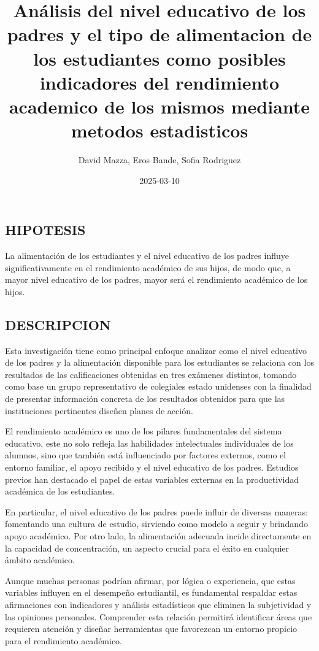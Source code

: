 \documentclass[
]{article}
\title{Análisis del nivel educativo de los padres y el tipo de
alimentacion de los estudiantes como posibles indicadores del
rendimiento academico de los mismos mediante metodos estadisticos}
\author{David Mazza, Eros Bande, Sofia Rodriguez}
\date{2025-03-10}
\begin{document}
\maketitle

\subsection{HIPOTESIS}\label{hipotesis}

La alimentación de los estudiantes y el nivel educativo de los padres
influye significativamente en el rendimiento académico de sus hijos, de
modo que, a mayor nivel educativo de los padres, mayor será el
rendimiento académico de los hijos.

\subsection{DESCRIPCION}\label{descripcion}

Esta investigación tiene como principal enfoque analizar como el nivel
educativo de los padres y la alimentación disponible para los
estudiantes se relaciona con los resultados de las calificaciones
obtenidas en tres exámenes distintos, tomando como base un grupo
representativo de colegiales estado unidenses con la finalidad de
presentar información concreta de los resultados obtenidos para que las
instituciones pertinentes diseñen planes de acción.

El rendimiento académico es uno de los pilares fundamentales del sistema
educativo, este no solo refleja las habilidades intelectuales
individuales de los alumnos, sino que también está influenciado por
factores externos, como el entorno familiar, el apoyo recibido y el
nivel educativo de los padres. Estudios previos han destacado el papel
de estas variables externas en la productividad académica de los
estudiantes.

En particular, el nivel educativo de los padres puede influir de
diversas maneras: fomentando una cultura de estudio, sirviendo como
modelo a seguir y brindando apoyo académico. Por otro lado, la
alimentación adecuada incide directamente en la capacidad de
concentración, un aspecto crucial para el éxito en cualquier ámbito
académico.

Aunque muchas personas podrían afirmar, por lógica o experiencia, que
estas variables influyen en el desempeño estudiantil, es fundamental
respaldar estas afirmaciones con indicadores y análisis estadísticos que
eliminen la subjetividad y las opiniones personales. Comprender esta
relación permitirá identificar áreas que requieren atención y diseñar
herramientas que favorezcan un entorno propicio para el rendimiento
académico.
\end{document}
